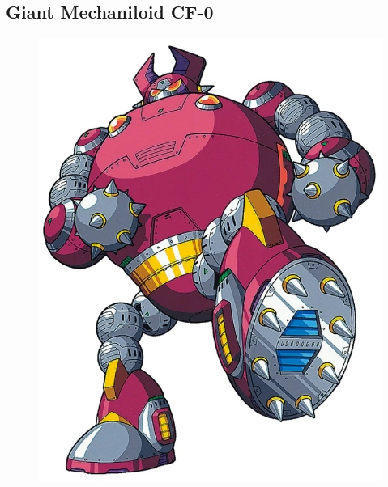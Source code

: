 \subsection{Giant Mechaniloid CF-0}
\begin{figure}[htp]
	\centering
	\includegraphics[height=\portraitsize]{figures/X2/Enemies/CF0.png}

\end{figure}
